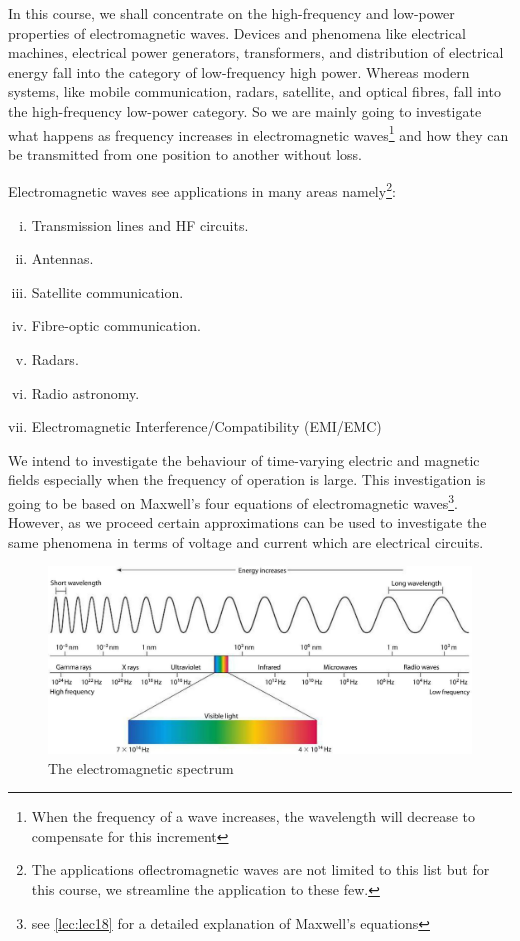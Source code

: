 In this course, we shall concentrate on the high-frequency and low-power properties of electromagnetic waves. Devices and phenomena like electrical machines, electrical power generators, transformers, and distribution of electrical energy fall into the category of low-frequency high power. Whereas modern systems, like mobile communication, radars, satellite, and optical fibres, fall into the high-frequency low-power category. So we are mainly going to investigate what happens as frequency increases in electromagnetic waves\footnote{When the frequency of a wave increases, the wavelength will decrease to compensate for this increment} and how they can be transmitted from one position to another without loss.

Electromagnetic waves see applications in many areas namely\footnote{The applications oflectromagnetic waves are not limited to this list but for this course, we streamline the application to these few.}:
\begin{enumerate}[(i)]
\item Transmission lines and HF circuits.
\item Antennas.
\item Satellite communication.
\item Fibre-optic communication.
\item Radars.
\item Radio astronomy.
\item Electromagnetic Interference/Compatibility (EMI/EMC)
\end{enumerate}

We intend to investigate the behaviour of time-varying electric and magnetic fields especially when the frequency of operation is large. This investigation is going to be based on Maxwell's four equations of electromagnetic waves\footnote{see \autoref{lec:lec18} for a detailed explanation of Maxwell's equations}. However, as we proceed certain approximations can be used to investigate the same phenomena in terms of voltage and current which are electrical circuits.

\begin{figure}[h]
\centering
\includegraphics[width=1\linewidth]{./graphics/electromagneticspectrum}
\caption{The electromagnetic spectrum}
\label{fig:electromagneticspectrum}
\end{figure}

